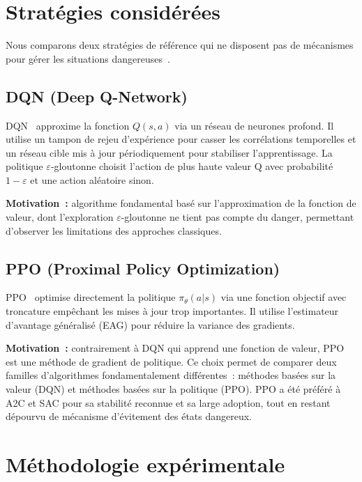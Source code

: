 \documentclass{article}
\begin{document}
\section{Stratégies considérées}

Nous comparons deux stratégies de référence qui ne disposent pas de mécanismes pour gérer les situations dangereuses~\cite{garcia2015comprehensive}.

\subsection{DQN (Deep Q-Network)}

DQN~\cite{mnih2015human} approxime la fonction $Q(s,a)$ via un réseau de neurones profond. Il utilise un tampon de rejeu d'expérience pour casser les corrélations temporelles et un réseau cible mis à jour périodiquement pour stabiliser l'apprentissage. La politique $\varepsilon$-gloutonne choisit l'action de plus haute valeur Q avec probabilité $1{-}\varepsilon$ et une action aléatoire sinon.

\textbf{Motivation~:} algorithme fondamental basé sur l'approximation de la fonction de valeur, dont l'exploration $\varepsilon$-gloutonne ne tient pas compte du danger, permettant d'observer les limitations des approches classiques.

\subsection{PPO (Proximal Policy Optimization)}

PPO~\cite{schulman2017proximal} optimise directement la politique $\pi_\theta(a|s)$ via une fonction objectif avec troncature empêchant les mises à jour trop importantes. Il utilise l'estimateur d'avantage généralisé (EAG) pour réduire la variance des gradients.

\textbf{Motivation~:} contrairement à DQN qui apprend une fonction de valeur, PPO est une méthode de gradient de politique. Ce choix permet de comparer deux familles d'algorithmes fondamentalement différentes~: méthodes basées sur la valeur (DQN) et méthodes basées sur la politique (PPO). PPO a été préféré à A2C et SAC pour sa stabilité reconnue et sa large adoption, tout en restant dépourvu de mécanisme d'évitement des états dangereux.

\section{Méthodologie expérimentale}
\end{document}
